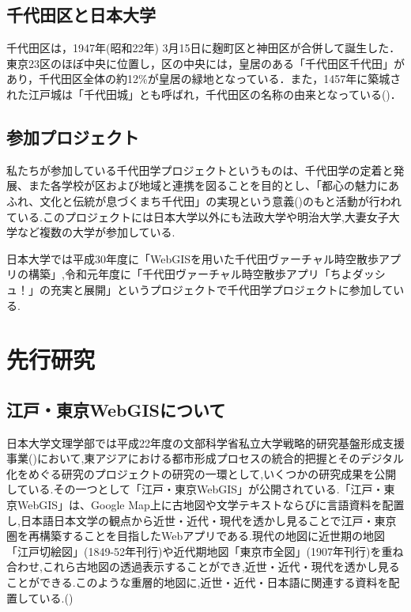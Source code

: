 \documentclass[a4paper, twoside]{jarticle}
\begin{document}
\begin{multicols}{2}
\subsection{千代田区と日本大学}
千代田区は，1947年(昭和22年) 3月15日に麹町区と神田区が合併して誕生した．東京23区のほぼ中央に位置し，区の中央には，皇居のある「千代田区千代田」があり，千代田区全体の約12\%が皇居の緑地となっている．また，1457年に築城された江戸城は「千代田城」とも呼ばれ，千代田区の名称の由来となっている(\cite{digi1})．

\subsection{参加プロジェクト}
私たちが参加している千代田学プロジェクトというものは、千代田学の定着と発展、また各学校が区および地域と連携を図ることを目的とし、「都心の魅力にあふれ、文化と伝統が息づくまち千代田」の実現という意義(\cite{chiyopro})のもと活動が行われている.このプロジェクトには日本大学以外にも法政大学や明治大学,大妻女子大学など複数の大学が参加している.\par
日本大学では平成30年度に「WebGISを用いた千代田ヴァーチャル時空散歩アプリの構築」,令和元年度に「千代田ヴァーチャル時空散歩アプリ「ちよダッシュ！」の充実と展開」というプロジェクトで千代田学プロジェクトに参加している.






\section{先行研究}


\subsection{江戸・東京WebGISについて}
日本大学文理学部では平成22年度の文部科学省私立大学戦略的研究基盤形成支援事業(\cite{monka})において,東アジアにおける都市形成プロセスの統合的把握とそのデジタル化をめぐる研究のプロジェクトの研究の一環として,いくつかの研究成果を公開 している.その一つとして「江戸・東京WebGIS」が公開されている.「江戸・東京WebGIS」は、Google Map上に古地図や文学テキストならびに言語資料を配置し,日本語日本文学の観点から近世・近代・現代を透かし見ることで江戸・東京圏を再構築することを目指したWebアプリである.現代の地図に近世期の地図「江戸切絵図」(1849-52年刊行)や近代期地図「東京市全図」(1907年刊行)を重ね合わせ,これら古地図の透過表示することができ,近世・近代・現代を透かし見ることができる.このような重層的地図に,近世・近代・日本語に関連する資料を配置している.(\cite{webgis_gaiyo})


\end{multicols}
\end{document}
